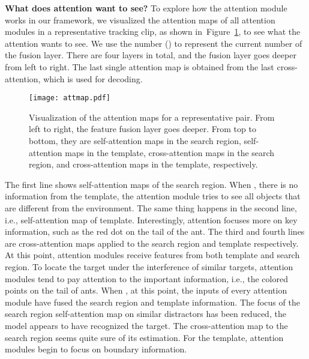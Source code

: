 \documentclass[final]{cvpr}
\begin{document}
{\noindent \textbf{What does attention want to see?}} 
To explore how the attention module works in our framework, we visualized the attention maps of all attention 
modules in a representative tracking clip, as shown in~Figure~\ref{fig:Attentionmap}, to see what the attention wants to see. 
We use the number  () to represent the current number of the fusion layer. 
There are four layers in total, and the fusion layer goes deeper from left to right.  
The last single attention map is obtained from the last cross-attention, which is used for decoding. 

\begin{figure}[t]
\begin{center}
\texttt{[image: attmap.pdf]}
\end{center}
   \caption{Visualization of the attention maps for a representative pair. From left to right, the feature fusion 
   layer goes deeper. From top to bottom, they are self-attention maps in the search region, self-attention maps 
   in the template, cross-attention maps in the search region, and cross-attention maps in the template, respectively.}
\label{fig:Attentionmap}
\end{figure}

The first line shows self-attention maps of the search region. When , there is no information from the template, the attention module tries to see all objects that are different from the environment. 
The same thing happens in the second line, i.e., self-attention map of template. 
Interestingly, attention focuses more on key information, such as the red dot on the tail of the ant. 
The third and fourth lines are cross-attention maps applied to the search region and template respectively. 
At this point, attention modules receive features from both template and search region. 
To locate the target under the interference of similar targets, attention modules tend to pay attention 
to the important information, i.e., the colored points on the tail of ants.
When , at this point, the inputs of every attention module have fused the search region and template information. 
The focus of the search region self-attention map on similar distractors has been reduced, the model appears to have 
recognized the target. The cross-attention map to the search region seems quite sure of its estimation. 
For the template, attention modules begin to focus on boundary information. 
\end{document}
